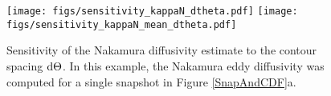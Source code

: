 \documentclass[11pt]{article}
\begin{document}
  
 \begin{figure}[ht]
    \centering
    \texttt{[image: figs/sensitivity\_kappaN\_dtheta.pdf]}
        \texttt{[image: figs/sensitivity\_kappaN\_mean\_dtheta.pdf]}\\
    \caption{\small Sensitivity of the Nakamura diffusivity estimate to the contour spacing ${\rm d} \Theta$. In this example, the Nakamura eddy diffusivity was computed for a single snapshot in Figure \ref{SnapAndCDF}a.}
        \label{SensitivitykNdTh}
\end{figure}
  
  
 
%
\end{document}
